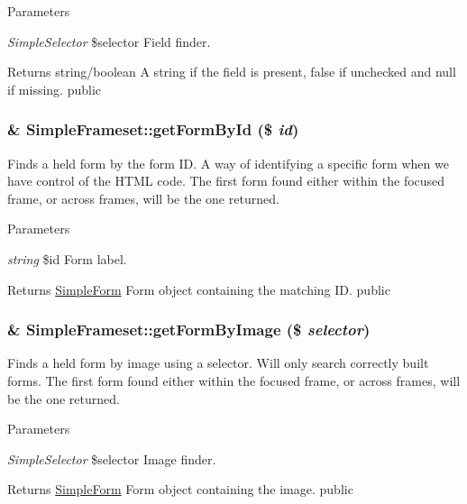 \begin{DoxyParams}{Parameters}
\item[{\em SimpleSelector}]\$selector Field finder. \end{DoxyParams}
\begin{DoxyReturn}{Returns}
string/boolean A string if the field is present, false if unchecked and null if missing.  public 
\end{DoxyReturn}
\hypertarget{class_simple_frameset_a2aabf4ba66c9721cdf882a27d3db7a68}{
\subsubsection[{getFormById}]{\setlength{\rightskip}{0pt plus 5cm}\& SimpleFrameset::getFormById (\$ {\em id})}}
\label{class_simple_frameset_a2aabf4ba66c9721cdf882a27d3db7a68}
Finds a held form by the form ID. A way of identifying a specific form when we have control of the HTML code. The first form found either within the focused frame, or across frames, will be the one returned. 
\begin{DoxyParams}{Parameters}
\item[{\em string}]\$id Form label. \end{DoxyParams}
\begin{DoxyReturn}{Returns}
\hyperlink{class_simple_form}{SimpleForm} Form object containing the matching ID.  public 
\end{DoxyReturn}
\hypertarget{class_simple_frameset_ac9d92c8a3996e7cfc343f34e9ca7a74e}{
\subsubsection[{getFormByImage}]{\setlength{\rightskip}{0pt plus 5cm}\& SimpleFrameset::getFormByImage (\$ {\em selector})}}
\label{class_simple_frameset_ac9d92c8a3996e7cfc343f34e9ca7a74e}
Finds a held form by image using a selector. Will only search correctly built forms. The first form found either within the focused frame, or across frames, will be the one returned. 
\begin{DoxyParams}{Parameters}
\item[{\em SimpleSelector}]\$selector Image finder. \end{DoxyParams}
\begin{DoxyReturn}{Returns}
\hyperlink{class_simple_form}{SimpleForm} Form object containing the image.  public 
\end{DoxyReturn}
